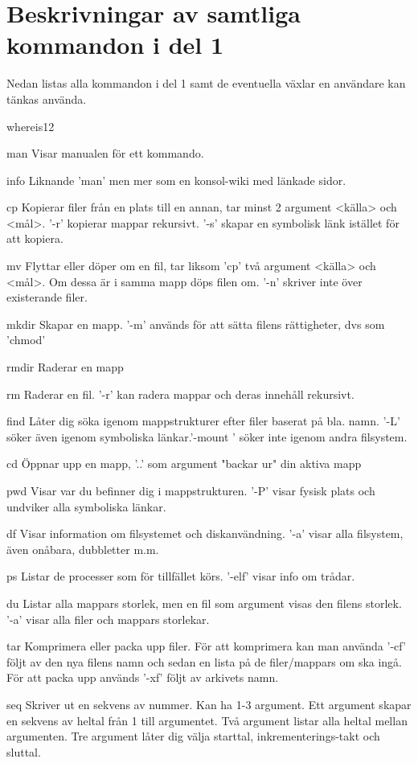 \documentclass[11pt]{article}
\begin{document}
\section{Beskrivningar av samtliga kommandon i del 1}
Nedan listas alla kommandon i del 1 samt de eventuella växlar en användare kan tänkas använda. 
\begin{labeling}{whereis12}
\item [man] Visar manualen för ett kommando. 
\item [info] Liknande 'man' men mer som en konsol-wiki med länkade sidor. 	
\item [cp] Kopierar filer från en plats till en annan, tar minst 2 argument <källa> och <mål>. '-r' kopierar mappar rekursivt. '-s' skapar en symbolisk länk istället för att kopiera.  
\item [mv] Flyttar eller döper om en fil, tar liksom 'cp' två argument <källa> och <mål>. Om dessa är i samma mapp döps filen om. '-n' skriver inte över existerande filer. 
\item [mkdir] Skapar en mapp. '-m' används för att sätta filens rättigheter, dvs som 'chmod'
\item [rmdir] Raderar en mapp 	
\item [rm] Raderar en fil. '-r' kan radera mappar och deras innehåll rekursivt.
\item [find] Låter dig söka igenom mappstrukturer efter filer baserat på bla. namn.	'-L' söker även igenom symboliska länkar.'-mount ' söker inte igenom andra filsystem.
\item [cd] Öppnar upp en mapp, '..' som argument "backar ur" din aktiva mapp 	
\item [pwd]  Visar var du befinner dig i mappstrukturen. '-P' visar fysisk plats och undviker alla symboliska länkar. 
\item [df] Visar information om filsystemet och diskanvändning. '-a' visar alla filsystem, även onåbara, dubbletter m.m.
\item [ps] Listar de processer som för tillfället körs. '-elf' visar info om trådar. 
\item [du] Listar alla mappars storlek, men en fil som argument visas den filens storlek. '-a' visar alla filer och mappars storlekar. 
\item [tar] Komprimera eller packa upp filer. För att komprimera kan man använda '-cf' följt av den nya filens namn och sedan en lista på de filer/mappars om ska ingå. För att packa upp används  '-xf' följt av arkivets namn. 	
\item [seq] Skriver ut en sekvens av nummer. Kan ha 1-3 argument. Ett argument skapar en sekvens av heltal från 1 till argumentet. Två argument listar alla heltal mellan argumenten. Tre argument låter dig välja starttal, inkrementerings-takt och sluttal.	

\end{labeling}
\end{document}
